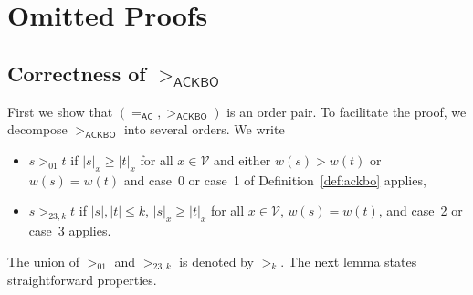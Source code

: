 \documentclass{tlp}
\newcommand{\m}[1]{\mathsf{#1}}
\newcommand{\mc}[1]{\mathcal{#1}}
\newcommand{\mr}[1]{\mathrm{#1}}
\newcommand{\VV}{\mc{V}}
\newcommand{\AC}{\mr{\m{AC}}}
\newcommand{\ackbo}{\mr{\m{ACKBO}}}
\begin{document}
\ifx\ARTICLE\undefined
\appendix

\section{Omitted Proofs}

\renewcommand{\thetheorem}{A.\arabic{theorem}}

\subsection{Correctness of $>_\ackbo$}
\label{A.1}

First we show that $({=_\AC},{>_\ackbo})$ is an order pair. To
facilitate the proof, we decompose $>_\ackbo$ into several orders. We
write
\begin{itemize}
\item
$s >_{01} t$ if $|s|_x \geqslant |t|_x$ for all $x \in \VV$
and either $w(s) > w(t)$ or $w(s) = w(t)$ and case~0 or
case~1 of Definition~\ref{def:ackbo} applies,
\smallskip
\item
$s >_{23,k} t$ if $|s|, |t| \leqslant k$, $|s|_x \geqslant |t|_x$
for all $x \in \VV$, $w(s) = w(t)$, and case~2 or case~3 applies.
\end{itemize}
The union of $>_{01}$ and $>_{23,k}$ is denoted by
$>_k$. The next lemma states straightforward properties.
\end{document}
